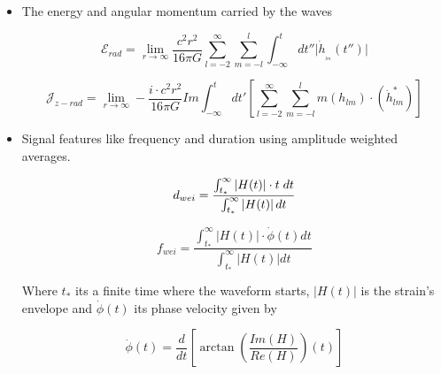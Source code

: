 \begin{itemize}

\item The energy and angular momentum carried by the waves \cite{Ruiz_2007}

%
%

\begin{equation}
\mathcal{E}_{rad} = \lim_{r\to\infty} \frac{c^2 r^2}{16\pi G} \sum_{l=-2}^{\infty}  \sum_{m=-l}^{l} \int_{-\infty}^{t} dt'' \Biggr|  \dot{h}_{_{_{lm}}}(t'')  \Biggr|
\end{equation}


\begin{equation}
\mathcal{J}_{z-rad} = \lim_{r\to\infty} -\frac{i \cdot c^2 r^2}{16\pi G} Im \int_{-\infty}^{t}dt'\left[ \sum_{l=-2}^{\infty} \sum_{m=-l}^{l} m  \left(h_{lm}\right)  \cdot \left( \dot{h}^*_{lm} \right) \right]
\end{equation}

\item Signal features like frequency and duration using amplitude weighted averages.

\begin{equation}\label{dwei}
d_{wei} = \frac{\int_{t_{*}}^{\infty} \left| H(t) \right| \cdot t \hspace{1mm}dt }{\int_{t_{*}}^{\infty} \left| H(t) \right| dt}
\end{equation}

\begin{equation}\label{fwei}
f_{wei} = \frac{\int_{t_{*}}^{\infty}  \left| H(t) \right| \cdot \dot{\phi}(t)  dt }{\int_{t_{*}}^{\infty} \left| H(t) \right|dt}
\end{equation}

Where $t_{*}$ its a finite time where the waveform starts, $\left| H(t) \right|$ is the strain's envelope and $\dot{\phi}(t)$ its phase velocity given by 

\begin{equation}\label{curnc}
\dot{\phi}(t)=\frac{d}{dt} \left[ \arctan \left( \frac{Im(H)}{Re(H)} \right)(t) \right]
\end{equation}

\end{itemize}




